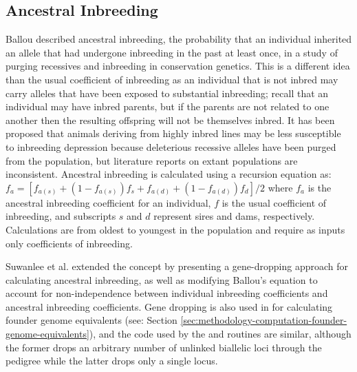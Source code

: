 \subsection{Ancestral Inbreeding}
\label{sec:methodology-ancestral-inbreeding}
Ballou \citeyear{Ballou1997} described ancestral inbreeding, the probability that an individual inherited an allele that had undergone inbreeding in the past at least once, in a study of purging recessives and inbreeding in conservation genetics. This is a different idea than the usual coefficient of inbreeding as an individual that is not inbred may carry alleles that have been exposed to substantial inbreeding; recall that an individual may have inbred parents, but if the parents are not related to one another then the resulting offspring will not be themselves inbred. It has been proposed that animals deriving from highly inbred lines may be less susceptible to inbreeding depression because deleterious recessive alleles have been purged from the population, but literature reports on extant populations are inconsistent. Ancestral inbreeding is calculated using a recursion equation as:
$f_a = [f_{a(s)} + (1 - f_{a(s)})f_s + f_{a(d)} + (1 - f_{a(d)})f_d ]/2$
where $f_a$ is the ancestral inbreeding coefficient for an individual, $f$ is the usual coefficient of inbreeding, and subscripts $s$ and $d$ represent sires and dams, respectively. Calculations are from oldest to youngest in the population and require as inputs only coefficients of inbreeding.

Suwanlee et al. \citeyear{SuwanleeBSC2007} extended the concept by presenting a gene-dropping approach \cite{ref1719} for calculating ancestral inbreeding, as well as modifying Ballou's equation to account for non-independence between individual inbreeding coefficients and ancestral inbreeding coefficients. Gene dropping is also used in \PyPedal{} for calculating founder genome equivalents (see: Section \ref{sec:methodology-computation-founder-genome-equivalents}), and the code used by the  and  routines are similar, although the former drops an arbitrary number of unlinked biallelic loci through the pedigree while the latter drops only a single locus.
